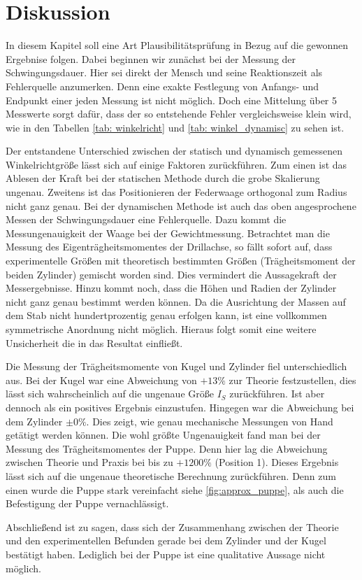 \section{Diskussion}
In diesem Kapitel soll eine Art Plausibilitätsprüfung in Bezug auf die
gewonnen Ergebnise folgen.
Dabei beginnen wir zunächst bei der Messung der Schwingungsdauer.
Hier sei direkt der Mensch und seine Reaktionszeit als Fehlerquelle anzumerken.
Denn eine exakte Festlegung von Anfangs- und Endpunkt einer jeden Messung ist
nicht möglich. %
Doch eine Mittelung
über 5 Messwerte sorgt dafür, dass der so entstehende Fehler vergleichsweise klein wird, wie in den Tabellen
\ref{tab: winkelricht} und \ref{tab: winkel_dynamisc} zu sehen ist.

Der entstandene Unterschied zwischen der statisch und dynamisch gemessenen Winkelrichtgröße
lässt sich auf einige Faktoren zurückführen.
Zum einen ist das Ablesen der Kraft bei der statischen Methode
durch die grobe Skalierung ungenau.
Zweitens ist das Positionieren der Federwaage orthogonal zum Radius
nicht ganz genau.
Bei der dynamischen Methode ist auch das oben angesprochene Messen der Schwingungsdauer
eine Fehlerquelle.
Dazu kommt die Messungenauigkeit der Waage bei der Gewichtmessung.
Betrachtet man die Messung des Eigenträgheitsmomentes der Drillachse, so fällt sofort auf,
dass experimentelle Größen mit theoretisch bestimmten Größen (Trägheitsmoment der beiden Zylinder)
gemischt worden sind.
Dies vermindert die Aussagekraft der Messergebnisse.
Hinzu kommt noch, dass die Höhen und Radien der Zylinder nicht ganz genau bestimmt werden können.
Da die Ausrichtung der Massen auf dem Stab nicht hundertprozentig genau erfolgen kann, ist
eine vollkommen symmetrische Anordnung nicht möglich.
Hieraus folgt somit eine weitere Unsicherheit die in das Resultat einfließt.

Die Messung der Trägheitsmomente von Kugel und Zylinder fiel unterschiedlich aus.
Bei der Kugel war eine Abweichung von $+13\%$ zur Theorie festzustellen,
dies lässt sich wahrscheinlich auf die ungenaue Größe $I_S$ zurückführen.
Ist aber dennoch als ein positives Ergebnis einzustufen.
Hingegen war die Abweichung bei dem Zylinder $\pm 0\%$. Dies zeigt,
wie genau mechanische Messungen von Hand getätigt werden können.
Die wohl größte Ungenauigkeit fand man bei der Messung des Trägheitsmomentes der Puppe.
Denn hier lag die Abweichung zwischen Theorie und Praxis bei bis zu
$+1200\%$ (Position 1). Dieses Ergebnis lässt sich auf die
ungenaue theoretische Berechnung zurückführen.
Denn zum einen wurde die Puppe stark vereinfacht siehe \ref{fig:approx_puppe}, als auch
die Befestigung der Puppe vernachlässigt.  %

Abschließend ist zu sagen, dass sich der Zusammenhang zwischen der Theorie und den experimentellen Befunden
gerade bei dem Zylinder und der Kugel bestätigt haben.
Lediglich bei der Puppe ist eine qualitative Aussage nicht möglich.
